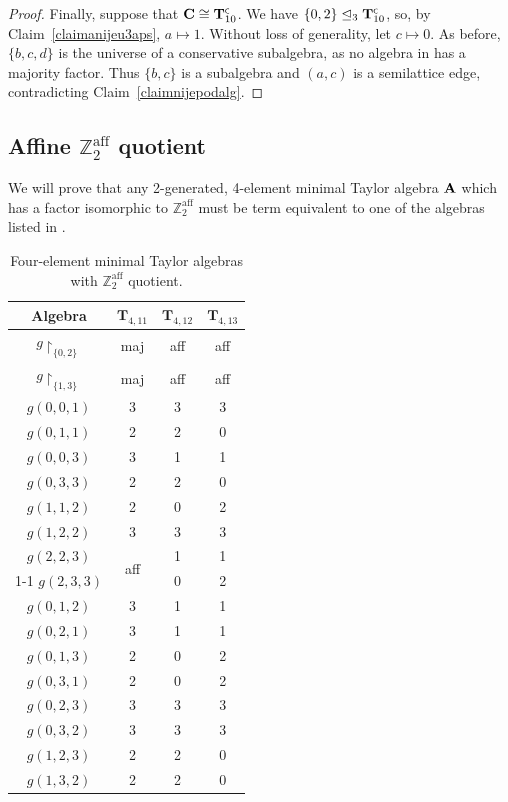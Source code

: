 \documentclass[11pt]{amsart}
\newcommand{\m}[1]{\mathbf{\uppercase{#1}}}
\newcommand{\co}{\scriptscriptstyle{\mathsf{C}}}
\theoremstyle{definition}
\theoremstyle{remark}
\theoremstyle{plain}
\def\T{\mathbf{T}}
\begin{document}
\begin{proof}
Finally, suppose that $\m c\cong\m t_{10}^{\co}$. We have $\{0,2\}\trianglelefteq_3 \m t_{10}^{\co}$, so, by Claim~\ref{claimanijeu3aps}, $a\mapsto 1$. Without loss of generality, let $c\mapsto 0$. As before, $\{b,c,d\}$ is the universe of a conservative subalgebra, as no algebra in  has a majority factor. Thus $\{b,c\}$ is a subalgebra and $(a,c)$ is a semilattice edge, contradicting Claim~\ref{claimnijepodalg}.
\end{proof}




\subsection{Affine $\mathbb{Z}^{\text{aff}}_2$ quotient}\label{s:Z2}

We will prove that any 2-generated, 4-element minimal Taylor algebra $\m a$ which has a factor isomorphic to $\mathbb{Z}^{\text{aff}}_2$ must be term equivalent to one of the algebras listed in .

\begin{table}[!ht]
\centering
 \begin{tabular}{|c||c|c|c|}
\hline
    Algebra & $\T_{4,11}$ & $\T_{4,12}$ & $\T_{4,13}$\\
\hline\hline
     $g{\restriction_{\{0,2\}}}$  & maj &  aff & aff \\
\hline
    $g{\restriction_{\{1,3\}}}$  & maj &  aff& aff\\

\hline
	$g(0,0,1)$ & 3 &  3 & 3\\
\hline
	$g(0,1,1)$ & 2 &  2 & 0\\	
\hline

    $g(0,0,3)$  & 3 &  1 & 1\\
\hline
	$g(0,3,3)$  & 2 &  2 & 0\\
\hline

        $g(1,1,2)$  & 2 &  0 & 2\\
\hline
	$g(1,2,2)$  & 3 &  3 & 3\\
\hline
 
	$g(2,2,3)$ & \multirow{2}{*}{aff} &  1 & 1\\
\cline{1-1} \cline{3-4}
	$g(2,3,3)$ &  &  0 & 2 \\

\hline
	$g(0,1,2)$ & 3 &  1 & 1 \\
\hline
	$g(0,2,1)$ & 3 &  1 & 1 \\
\hline
	$g(0,1,3)$ & 2 &  0 & 2 \\
\hline
	$g(0,3,1)$ & 2 &  0 & 2\\
\hline
	$g(0,2,3)$ & 3 &  3 & 3 \\
\hline
	$g(0,3,2)$ & 3 &  3 & 3 \\
\hline
	$g(1,2,3)$ & 2 &  2 & 0 \\
\hline
	$g(1,3,2)$ & 2 &  2 &  0\\
\hline
\end{tabular} 
\caption{Four-element minimal Taylor algebras with $\mathbb{Z}^{\text{aff}}_2$ quotient.}
\label{table 2-affine}
\end{table}
\end{document}
